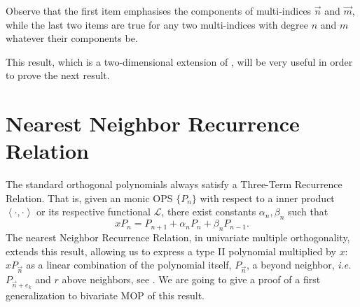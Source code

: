 \documentclass[12pt,a4]{article}
\theoremstyle{plain}
\newcommand{\prodesc}[2]{\left\langle #1 , #2 \right\rangle}
\begin{document}
Observe that the first item emphasises the components of multi-indices $\vec n$ and $\vec m$, while the last two items are true for any two multi-indices with degree $n$ and $m$ whatever their components be.

This result, which is a two-dimensional extension of \cite[Theorem 23.1.6]{Ismail}, will be very useful in order to prove the next result.

\section{Nearest Neighbor Recurrence Relation}

The standard orthogonal polynomials always satisfy a Three-Term Recurrence Relation. That is, given an monic OPS $\{P_n\}$ with respect to a inner product $\prodesc{\cdot}{\cdot}$ or its respective functional $\mathcal L$, there exist constants $\alpha_n,\beta_n$ such that
$$
xP_n = P_{n+1}+ \alpha_n P_n + \beta_n P_{n-1}.
$$
The nearest Neighbor Recurrence Relation, in univariate multiple orthogonality, extends this result, allowing us to express a type II polynomial multiplied by $x$: $xP_{\vec n}$ as a linear combination of the polynomial itself, $P_{\vec n}$, a beyond neighbor, \textit{i.e.} $P_{\vec n + e_k}$ and $r$ above neighbors, see \cite[Theorem 23.1.7]{Ismail}. We are going to give a proof of a first generalization to bivariate MOP of this result. 
\end{document}
